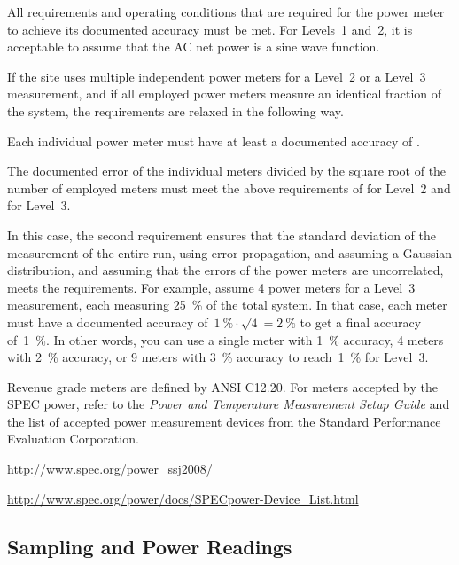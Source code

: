 All requirements and operating conditions that are required for the power meter to achieve its documented accuracy must be met.
For Levels~1 and~2, it is acceptable to assume that the AC net power is a sine wave function.

If the site uses multiple independent power meters for a Level~2 or a Level~3 measurement, and if all employed power meters measure an identical fraction of the system, the requirements are relaxed in the following way.
\begin{packed_item}
\item 
Each individual power meter must have at least a documented accuracy of \SpecAccuracyMeter{}.
\item
The documented error of the individual meters divided by the square root of the number of employed meters must meet the above requirements of \SpecAccuracyLTwo{} for Level~2 and \SpecAccuracyLThree{} for Level~3.
\end{packed_item}
In this case, the second requirement ensures that the standard deviation of the measurement of the entire run, using error propagation, and assuming a Gaussian distribution, and assuming that the errors of the power meters are uncorrelated, meets the requirements.
For example, assume 4 power meters for a Level~3 measurement, each measuring \SI{25}{\percent} of the total system.
In that case, each meter must have a documented accuracy of~$\SI{1}{\percent} \cdot \sqrt{4} = \SI{2}{\percent}$ to get a final accuracy of~\SI{1}{\percent}.
In other words, you can use a single meter with \SI{1}{\percent} accuracy, \num{4} meters with \SI{2}{\percent} accuracy, or \num{9} meters with \SI{3}{\percent} accuracy to reach~\SI{1}{\percent} for Level~3.

Revenue grade meters are defined by ANSI C12.20.
For meters accepted by the SPEC power, refer to the {\itshape Power and Temperature Measurement Setup Guide \/} and the list of accepted power measurement devices from the Standard Performance Evaluation Corporation.
\begin{packed_item}
\item 
\url{http://www.spec.org/power_ssj2008/}
\item
\url{http://www.spec.org/power/docs/SPECpower-Device_List.html }
\end{packed_item}

\subsection{Sampling and Power Readings}

